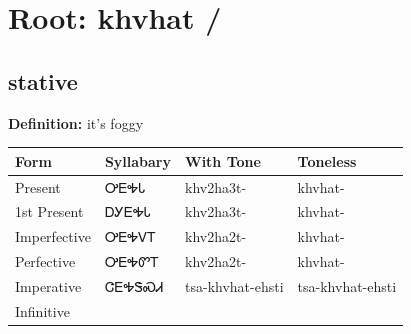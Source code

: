 \documentclass{article}%
\begin{document}
%
\normalsize%
\section*{Root: khvhat / }%
\subsection*{stative}%
\textbf{Definition: }%
it’s foggy%
\\[0.5em]%
\begin{tabular}{|l|l|l|l|}%
\hline%
\textbf{Form}&\textbf{Syllabary}&\textbf{With Tone}&\textbf{Toneless}\\%
\hline%
Present&ᎤᎬᎭᏓ&khv2ha3t{-}&khvhat{-}\\%
1st Present&ᎠᎩᎬᎭᏓ&khv2ha3t{-}&khvhat{-}\\%
Imperfective&ᎤᎬᎭᏙᎢ&khv2ha2t{-}&khvhat{-}\\%
Perfective&ᎤᎬᎭᏛᎢ&khv2ha2t{-}&khvhat{-}\\%
Imperative&ᏣᎬᎭᏕᏍᏗ&tsa{-}khvhat{-}ehsti&tsa{-}khvhat{-}ehsti\\%
Infinitive&&&\\%
\hline%
\end{tabular}%
\\[1em]%
\end{document}
